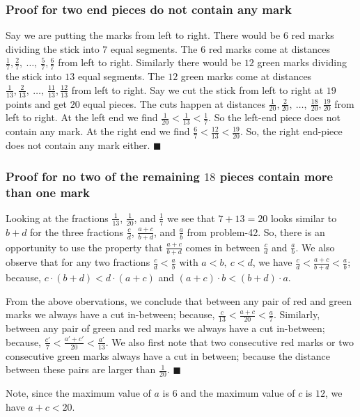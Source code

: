 \documentclass{article}
\begin{document}
\subsubsection{Proof for two end pieces do not contain any mark}
Say we are putting the marks from left to right. There would be $6$ red marks dividing the stick into $7$ equal segments. The $6$ red marks come at distances $\frac{1}{7}, \frac{2}{7},\ \ldots,\ \frac{5}{7}, \frac{6}{7}$ from left to right. Similarly there would be $12$ green marks dividing the stick into $13$ equal segments. The $12$ green marks come at distances $\frac{1}{13}, \frac{2}{13},\ \ldots,\ \frac{11}{13},\frac{12}{13}$ from left to right. Say we cut the stick from left to right at $19$ points and get $20$ equal pieces. The cuts happen at distances $\frac{1}{20}, \frac{2}{20},\ \ldots,\ \frac{18}{20}, \frac{19}{20}$ from left to right. At the left end we find $\frac{1}{20} < \frac{1}{13} < \frac{1}{7}$. So the left-end piece does not contain any mark. At the right end we find $\frac{6}{7} < \frac{12}{13} < \frac{19}{20}$. So, the right end-piece does not contain any mark either.  $\blacksquare$

\subsubsection{Proof for no two of the remaining $18$ pieces contain more than one mark}
Looking at the fractions $\frac{1}{13}$, $\frac{1}{20}$, and $\frac{1}{7}$ we see that $7+13=20$ looks similar to $b+d$ for the three fractions $\frac{c}{d}$, $\frac{a+c}{b+d}$, and $\frac{a}{b}$ from problem-42. So, there is an opportunity to use the property that $\frac{a+c}{b+d}$ comes in between $\frac{c}{d}$ and $\frac{a}{b}$. We also observe that for any two fractions $\frac{c}{d} < \frac{a}{b}$ with $a < b,\ c < d$, we have $\frac{c}{d} < \frac{a+c}{b+d} < \frac{a}{b}$; because, $c \cdot (b+d) < d \cdot (a+c)$ and $(a+c) \cdot b < (b+d) \cdot a$.

From the above obervations, we conclude that between any pair of red and green marks we always have a cut in-between; because, $\frac{c}{13} < \frac{a+c}{20} < \frac{a}{7}$. Similarly, between any pair of green and red marks we always have a cut in-between; because, $\frac{c'}{7} < \frac{a'+c'}{20} < \frac{a'}{13}$. We also first note that two consecutive red marks or two consecutive green marks always have a cut in between; because the distance between these pairs are larger than $\frac{1}{20}$.   $\blacksquare$

Note, since the maximum value of $a$ is $6$ and the maximum value of $c$ is $12$, we have $a+c < 20$.
\end{document}
